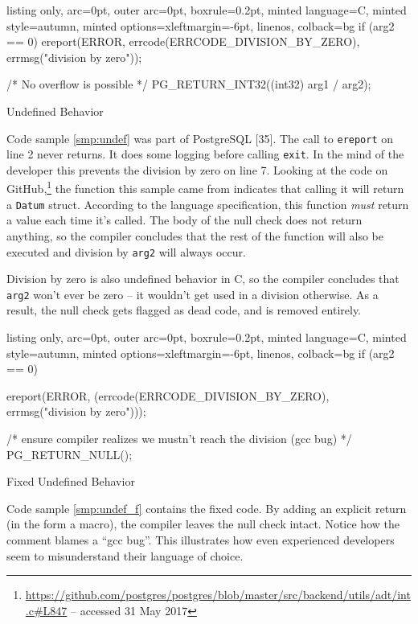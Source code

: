 \documentclass[a4paper, 16pt, oneside]{Thesis}
\begin{document}
\begin{code}
  \begin{tcblisting}{listing only, 
  arc=0pt,
  outer arc=0pt, 
  boxrule=0.2pt,
  minted language=C,
  minted style=autumn,
  minted options={xleftmargin=-6pt, linenos},
  colback=bg }
if (arg2 == 0)
  ereport(ERROR, 
    errcode(ERRCODE_DIVISION_BY_ZERO),
    errmsg("division by zero"));
                    
/* No overflow is possible */
PG_RETURN_INT32((int32) arg1 / arg2);
\end{tcblisting}
\caption{Undefined Behavior}\label{smp:undef}
\end{code}

Code sample \ref{smp:undef} was part of PostgreSQL {[}35{]}. The call to
\texttt{ereport} on line 2 never returns. It does some logging before
calling \texttt{exit}. In the mind of the developer this prevents the
division by zero on line 7. Looking at the code on GitHub,\footnote{\url{https://github.com/postgres/postgres/blob/master/src/backend/utils/adt/int.c\#L847}
  -- accessed 31 May 2017} the function this sample came from indicates
that calling it will return a \texttt{Datum} struct. According to the
language specification, this function \emph{must} return a value each
time it's called. The body of the null check does not return anything,
so the compiler concludes that the rest of the function will also be
executed and division by \texttt{arg2} will always occur.

Division by zero is also undefined behavior in C, so the compiler
concludes that \texttt{arg2} won't ever be zero -- it wouldn't get used
in a division otherwise. As a result, the null check gets flagged as
dead code, and is removed entirely.

\begin{code}
  \begin{tcblisting}{listing only, 
  arc=0pt,
  outer arc=0pt, 
  boxrule=0.2pt,
  minted language=C,
  minted style=autumn,
  minted options={xleftmargin=-6pt, linenos},
  colback=bg }
if (arg2 == 0)
{
  ereport(ERROR,
      (errcode(ERRCODE_DIVISION_BY_ZERO),
       errmsg("division by zero")));

  /* ensure compiler realizes we mustn't reach the division 
  (gcc bug) */
  PG_RETURN_NULL();
}
\end{tcblisting}
\caption{Fixed Undefined Behavior}\label{smp:undef_f}
\end{code}

Code sample \ref{smp:undef_f} contains the fixed code. By adding an
explicit return (in the form a macro), the compiler leaves the null
check intact. Notice how the comment blames a ``gcc bug''. This
illustrates how even experienced developers seem to misunderstand their
language of choice.
\end{document}
